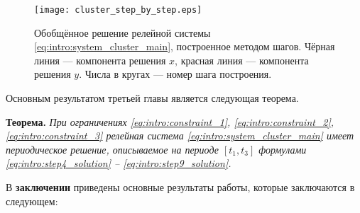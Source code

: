\begin{figure}[!ht]
	\centering
	\texttt{[image: cluster\_step\_by\_step.eps]}
	\caption{Обобщённое решение релейной системы \eqref{eq:intro:system_cluster_main}, построенное методом шагов. Чёрная линия --- компонента решения $x$, красная линия --- компонента решения $y$. Числа в кругах --- номер шага построения.}
	\label{fig:intro:cluster_step_by_step}
\end{figure}

Основным результатом третьей главы является следующая теорема.

\textbf{Теорема.} \textit{При ограничениях \eqref{eq:intro:constraint_1}, \eqref{eq:intro:constraint_2}, \eqref{eq:intro:constraint_3} релейная система \eqref{eq:intro:system_cluster_main} имеет периодическое решение, описываемое на периоде $[t_1, t_3]$ формулами \eqref{eq:intro:step4_solution} -- \eqref{eq:intro:step9_solution}.}

\FloatBarrier
{}                                  %
В \textbf{заключении} приведены основные результаты работы, которые заключаются в следующем:



